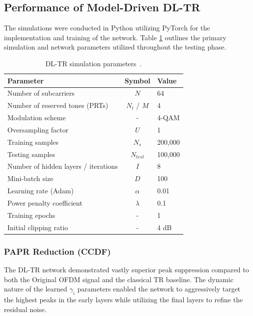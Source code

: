 \subsection{Performance of Model-Driven DL-TR}
The simulations were conducted in Python utilizing PyTorch for the implementation and training of the network. Table \ref{tab:dltr_sim_params} outlines the primary simulation and network parameters utilized throughout the testing phase.

\begin{table}[H]
    \centering
    \caption{DL-TR simulation parameters~\cite{dl_tr}.}
    \label{tab:dltr_sim_params}
    \begin{tabular}{@{} l c l @{}}
        \toprule
        \textbf{Parameter}                   & \textbf{Symbol} & \textbf{Value} \\
        \midrule
        Number of subcarriers                & $N$             & 64             \\
        Number of reserved tones (PRTs)      & $N_t$ / $M$     & 4              \\
        Modulation scheme                    & -               & 4-QAM          \\
        Oversampling factor                  & $U$             & 1              \\
        Training samples                     & $N_s$           & 200,000        \\
        Testing samples                      & $N_{test}$      & 100,000        \\
        Number of hidden layers / iterations & $I$             & 8              \\
        Mini-batch size                      & $D$             & 100            \\
        Learning rate (Adam)                 & $\alpha$        & 0.01           \\
        Power penalty coefficient            & $\lambda$       & 0.1            \\
        Training epochs                      & -               & 1              \\
        Initial clipping ratio               & -               & 4 dB           \\
        \bottomrule
    \end{tabular}
\end{table}

\subsubsection{PAPR Reduction (CCDF)}
The DL-TR network demonstrated vastly superior peak suppression compared to both the Original OFDM signal and the classical TR baseline. The dynamic nature of the learned $\gamma_i$ parameters enabled the network to aggressively target the highest peaks in the early layers while utilizing the final layers to refine the residual noise.

